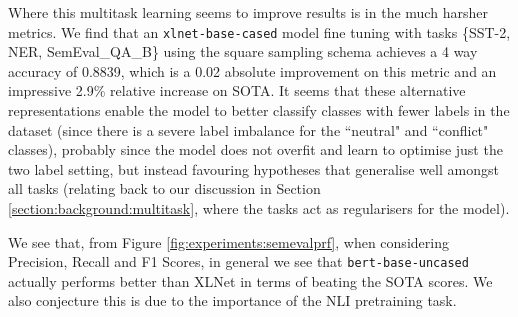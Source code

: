 Where this multitask learning seems to improve results is in the much harsher metrics. We find that an \texttt{xlnet-base-cased} model fine tuning with tasks \{SST-2, NER, SemEval\_QA\_B\} using the square sampling schema achieves a 4 way accuracy of 0.8839, which is a 0.02 absolute improvement on this metric and an impressive 2.9\% relative increase on SOTA. It seems that these alternative representations enable the model to better classify classes with fewer labels in the dataset (since there is a severe label imbalance for the ``neutral" and ``conflict" classes), probably since the model does not overfit and learn to optimise just the two label setting, but instead favouring hypotheses that generalise well amongst all tasks (relating back to our discussion in Section \ref{section:background:multitask}, where the tasks act as regularisers for the model).

We see that, from Figure \ref{fig:experiments:semevalprf}, when considering Precision, Recall and F1 Scores, in general we see that \texttt{bert-base-uncased} actually performs better than XLNet in terms of beating the SOTA scores. We also conjecture this is due to the importance of the NLI pretraining task.

